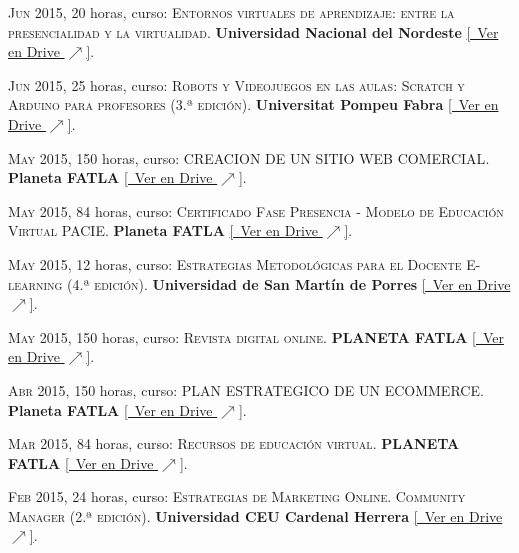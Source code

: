 \documentclass[a4paper]{article}
\begin{document}
\textsc{Jun} 2015, 20 horas, curso: \textsc{Entornos virtuales de aprendizaje: entre la presencialidad y la virtualidad}.
\textbf{Universidad Nacional del Nordeste} \small \href{https://drive.google.com/file/d/10xBXX78kHt3I257d1NGcjhD0mn7Kp1BN/view}{[\faGoogleDrive~Ver en Drive $\nearrow$]}.

\textsc{Jun} 2015, 25 horas, curso: \textsc{Robots y Videojuegos en las aulas: Scratch y Arduino para profesores (3.ª edición)}.
\textbf{Universitat Pompeu Fabra} \small \href{https://drive.google.com/file/d/1o2BkGV4lbyZtMVFEQSgkuVo_ymjnNsxr/view}{[\faGoogleDrive~Ver en Drive $\nearrow$]}.

\textsc{May} 2015, 150 horas, curso: \textsc{CREACION DE UN SITIO WEB COMERCIAL}.
\textbf{Planeta FATLA} \small \href{https://drive.google.com/file/d/1YIPZXGf-8ExslBKwP5YpNkxh4A1u4xhP/view}{[\faGoogleDrive~Ver en Drive $\nearrow$]}.

\textsc{May} 2015, 84 horas, curso: \textsc{Certificado Fase Presencia - Modelo de Educación Virtual PACIE}.
\textbf{Planeta FATLA} \small \href{https://drive.google.com/file/d/1mur610b6HvOBIkwfIm3QkO-Jfed-mt8I/view}{[\faGoogleDrive~Ver en Drive $\nearrow$]}.

\textsc{May} 2015, 12 horas, curso: \textsc{Estrategias Metodológicas para el Docente E-learning (4.ª edición)}.
\textbf{Universidad de San Martín de Porres} \small \href{https://drive.google.com/file/d/1tJpkrPZNdAMyGSB6rm8mrGOGzDl4EwCa/view}{[\faGoogleDrive~Ver en Drive $\nearrow$]}.

\textsc{May} 2015, 150 horas, curso: \textsc{Revista digital online}.
\textbf{PLANETA FATLA} \small \href{https://drive.google.com/file/d/1ar80_PmjfTawdpo-j47gL0e30UWqf7iO/view}{[\faGoogleDrive~Ver en Drive $\nearrow$]}.

\textsc{Abr} 2015, 150 horas, curso: \textsc{PLAN ESTRATEGICO DE UN ECOMMERCE}.
\textbf{Planeta FATLA} \small \href{https://drive.google.com/file/d/1pV5dm5754oHD17Ze9X2K-Uc5pDJbYmX2/view}{[\faGoogleDrive~Ver en Drive $\nearrow$]}.

\textsc{Mar} 2015, 84 horas, curso: \textsc{Recursos de educación virtual}.
\textbf{PLANETA FATLA} \small \href{https://drive.google.com/file/d/12MtY-sVwTpwu-cR_CFbz926HKOPWUZnI/view}{[\faGoogleDrive~Ver en Drive $\nearrow$]}.

\textsc{Feb} 2015, 24 horas, curso: \textsc{Estrategias de Marketing Online. Community Manager (2.ª edición)}.
\textbf{Universidad CEU Cardenal Herrera} \small \href{https://drive.google.com/file/d/1pU15uXwAuC28IDIr2gl8rd8MnSJBxRb6/view}{[\faGoogleDrive~Ver en Drive $\nearrow$]}.
\end{document}
